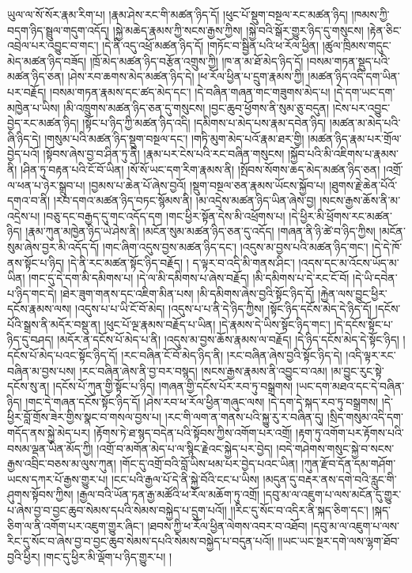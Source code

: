 ཡུལ་ལ་སོ་སོར་རྣམ་རིག་པ། །རྣམ་ཤེས་རང་གི་མཚན་ཉིད་དོ། །ཕུང་པོ་སྡུག་བསྔལ་རང་མཚན་ཉིད། །ཁམས་ཀྱི་བདག་ཉིད་སྦྲུལ་གདུག་འདོད། །སྐྱེ་མཆེད་རྣམས་ཀྱི་སངས་རྒྱས་ཀྱིས། །སྐྱེ་བའི་སྒོར་གྱུར་ཉིད་དུ་གསུངས། །རྟེན་ཅིང་འབྲེལ་པར་འབྱུང་བ་གང་། །དེ་ནི་འདུ་འཕྲོ་མཚན་ཉིད་དོ། །གཏོང་བ་སྦྱིན་པའི་ཕ་རོལ་ཕྱིན། །ཚུལ་ཁྲིམས་གདུང་མེད་མཚན་ཉིད་བཟོད། །ཁྲོ་མེད་མཚན་ཉིད་བརྩོན་འགྲུས་ཀྱི། །ཁ་ན་མ་ཐོ་མེད་ཉིད་དོ། །བསམ་གཏན་སྡུད་པའི་མཚན་ཉིད་ཅན། །ཤེས་རབ་ཆགས་མེད་མཚན་ཉིད་དེ། །ཕ་རོལ་ཕྱིན་པ་དྲུག་རྣམས་ཀྱི། །མཚན་ཉིད་འདི་དག་ཡིན་པར་བརྗོད། །བསམ་གཏན་རྣམས་དང་ཚད་མེད་དང་། །དེ་བཞིན་གཞན་གང་གཟུགས་མེད་པ། །དེ་དག་ཡང་དག་མཁྱེན་པ་ཡིས། །མི་འཁྲུགས་མཚན་ཉིད་ཅན་དུ་གསུངས། །བྱང་ཆུབ་ཕྱོགས་ནི་སུམ་ཅུ་བདུན། །ངེས་པར་འབྱུང་བྱེད་རང་མཚན་ཉིད། །སྟོང་པ་ཉིད་ཀྱི་མཚན་ཉིད་འདི། །དམིགས་པ་མེད་པས་རྣམ་དབེན་ཉིད། །མཚན་མ་མེད་པའི་ཞི་ཉིད་དེ། །གསུམ་པའི་མཚན་ཉིད་སྡུག་བསྔལ་དང་། །གཏི་མུག་མེད་པའོ་རྣམ་ཐར་གྱི། །མཚན་ཉིད་རྣམ་པར་གྲོལ་བྱེད་པའོ། །སྟོབས་ཞེས་བྱ་བ་ཤིན་ཏུ་ནི། །རྣམ་པར་ངེས་པའི་རང་བཞིན་གསུངས། །སྐྱོབ་པའི་མི་འཇིགས་པ་རྣམས་ནི། །ཤིན་ཏུ་བརྟན་པའི་ངོ་བོ་ཡིན། །སོ་སོ་ཡང་དག་རིག་རྣམས་ནི། །སྤོབས་སོགས་ཆད་མེད་མཚན་ཉིད་ཅན། །འགྲོ་ལ་ཕན་པ་ཉེར་སྒྲུབ་པ། །བྱམས་པ་ཆེན་པོ་ཞེས་བྱའོ། །སྡུག་བསྔལ་ཅན་རྣམས་ཡོངས་སྐྱོབ་པ། །ཐུགས་རྗེ་ཆེན་པོའོ་དགའ་བ་ནི། །རབ་དགའ་མཚན་ཉིད་བཏང་སྙོམས་ནི། །མ་འདྲེས་མཚན་ཉིད་ཡིན་ཞེས་བྱ། །སངས་རྒྱས་ཆོས་ནི་མ་འདྲེས་པ། །བཅུ་དང་བརྒྱད་དུ་གང་འདོད་དག །གང་ཕྱིར་སྟོན་དེས་མི་འཕྲོགས་པ། །དེ་ཕྱིར་མི་ཕྲོགས་རང་མཚན་ཉིད། །རྣམ་ཀུན་མཁྱེན་ཉིད་ཡེ་ཤེས་ནི། །མངོན་སུམ་མཚན་ཉིད་ཅན་དུ་འདོད། །གཞན་ནི་ཉི་ཚེ་བ་ཉིད་ཀྱིས། །མངོན་སུམ་ཞེས་བྱར་མི་འདོད་དོ། །གང་ཞིག་འདུས་བྱས་མཚན་ཉིད་དང་། །འདུས་མ་བྱས་པའི་མཚན་ཉིད་གང་། །དེ་དེ་ཁོ་ནས་སྟོང་པ་ཉིད། །དེ་ནི་རང་མཚན་སྟོང་ཉིད་བརྗོད། །
ད་ལྟར་བ་འདི་མི་གནས་ཤིང་། །འདས་དང་མ་འོངས་ཡོད་མ་ཡིན། །གང་དུ་དེ་དག་མི་དམིགས་པ། །དེ་ལ་མི་དམིགས་པ་ཞེས་བརྗོད། །མི་དམིགས་པ་དེ་རང་ངོ་བོ། །དེ་ཡི་དབེན་པ་ཉིད་གང་དེ། །ཐེར་ཟུག་གནས་དང་འཇིག་མིན་པས། །མི་དམིགས་ཞེས་བྱའི་སྟོང་ཉིད་དོ། །རྐྱེན་ལས་བྱུང་ཕྱིར་དངོས་རྣམས་ལས། །འདུས་པ་པ་ཡི་ངོ་བོ་མེད། །འདུས་པ་པ་ནི་དེ་ཉིད་ཀྱིས། །སྟོང་ཉིད་དངོས་མེད་དེ་ཉིད་དོ། །དངོས་པོའི་སྒྲས་ནི་མདོར་བསྡུ་ན། །ཕུང་པོ་ལྔ་རྣམས་བརྗོད་པ་ཡིན། །དེ་རྣམས་དེ་ཡིས་སྟོང་ཉིད་གང་། །དེ་དངོས་སྟོང་པ་ཉིད་དུ་བཤད། །མདོར་ན་དངོས་པོ་མེད་པ་ནི། །འདུས་མ་བྱས་ཆོས་རྣམས་ལ་བརྗོད། །དེ་ཉིད་དངོས་མེད་དེ་སྟོང་ཉིད། །དངོས་པོ་མེད་པའང་སྟོང་ཉིད་དོ། །རང་བཞིན་ངོ་བོ་མེད་ཉིད་ནི། །རང་བཞིན་ཞེས་བྱའི་སྟོང་ཉིད་དེ། །འདི་ལྟར་རང་བཞིན་མ་བྱས་པས། །རང་བཞིན་ཞེས་ནི་བྱ་བར་བསྙད། །སངས་རྒྱས་རྣམས་ནི་འབྱུང་བ་འམ། །མ་བྱུང་རུང་སྟེ་དངོས་སུ་ན། །དངོས་པོ་ཀུན་གྱི་སྟོང་པ་ཉིད། །གཞན་གྱི་དངོས་པོར་རབ་ཏུ་བསྒྲགས། །ཡང་དག་མཐའ་དང་དེ་བཞིན་ཉིད། །གང་དེ་གཞན་དངོས་སྟོང་ཉིད་དོ། །ཤེས་རབ་ཕ་རོལ་ཕྱིན་གཞུང་ལས། །དེ་དག་དེ་སྐད་རབ་ཏུ་བསྒྲགས། །དེ་ཕྱིར་བློ་གྲོས་ཟེར་གྱིས་སྣང་བ་གསལ་བྱས་པ། །རང་གི་ལག་ན་གནས་པའི་སྐྱུ་རུ་ར་བཞིན་དུ། །སྲིད་གསུམ་འདི་དག་གདོད་ནས་སྐྱེ་མེད་པར། །རྟོགས་ཏེ་ཐ་སྙད་བདེན་པའི་སྟོབས་ཀྱིས་འགོག་པར་འགྲོ། །རྟག་ཏུ་འགོག་པར་རྟོགས་པའི་བསམ་ལྡན་ཡིན་མོད་ཀྱི། །འགྲོ་བ་མགོན་མེད་པ་ལ་སྙིང་རྗེའང་སྐྱེད་པར་བྱེད། །བདེ་གཤེགས་གསུང་སྐྱེ་བ་སངས་རྒྱས་འབྲིང་བཅས་མ་ལུས་ཀུན། །གོང་དུ་འགྲོ་བའི་བློ་ཡིས་ཕམ་པར་བྱེད་པའང་ཡིན། །ཀུན་རྫོབ་དོན་དམ་གཤོག་ཡངས་དཀར་པོ་རྒྱས་གྱུར་པ། །ངང་པའི་རྒྱལ་པོ་དེ་ནི་སྐྱེ་བོའི་ངང་པ་ཡིས། །མདུན་དུ་བརྡར་ནས་དགེ་བའི་རླུང་གི་ཤུགས་སྟོབས་ཀྱིས། །རྒྱལ་བའི་ཡོན་ཏན་རྒྱ་མཚོའི་ཕ་རོལ་མཆོག་ཏུ་འགྲོ། །དབུ་མ་ལ་འཇུག་པ་ལས་མངོན་དུ་གྱུར་པ་ཞེས་བྱ་བ་བྱང་ཆུབ་སེམས་དཔའི་སེམས་བསྐྱེད་པ་དྲུག་པའོ།། །།རིང་དུ་སོང་བ་འདིར་ནི་སྐད་ཅིག་དང་། །སྐད་ཅིག་ལ་ནི་འགོག་པར་འཇུག་གྱུར་ཞིང་། །ཐབས་ཀྱི་ཕ་རོལ་ཕྱིན་ལེགས་འབར་བ་འཐོབ། །དབུ་མ་ལ་འཇུག་པ་ལས་རིང་དུ་སོང་བ་ཞེས་བྱ་བ་བྱང་ཆུབ་སེམས་དཔའི་སེམས་བསྐྱེད་པ་བདུན་པའོ།། །།ཡང་ཡང་སྔར་དགེ་ལས་ལྷག་ཐོབ་བྱའི་ཕྱིར། །གང་དུ་ཕྱིར་མི་ལྡོག་པ་ཉིད་གྱུར་པ། །
